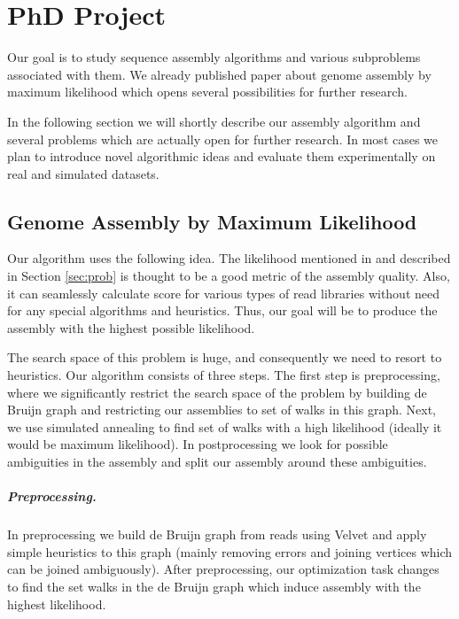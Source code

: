 \chapter{PhD Project}

Our goal is to study sequence assembly algorithms and
various subproblems associated with them.
We already published paper about genome assembly by maximum likelihood \citep{GAML}
which opens several possibilities for further research.

In the following section we will shortly describe our assembly algorithm
and several problems which are actually open for further research.
In most cases we plan to introduce novel algorithmic ideas
and evaluate them experimentally on real and simulated datasets.

\section{Genome Assembly by Maximum Likelihood}

Our algorithm uses the following idea.
The likelihood  mentioned in \cite{Ghodsi2013} and described in Section \ref{sec:prob} 
is thought to be a good metric of the assembly quality.
Also, it can seamlessly calculate score for various types of read libraries without need
for any special algorithms and heuristics. 
Thus, our goal will be to produce the assembly with the highest possible likelihood.

The search space of this problem is huge, and consequently 
we need to resort to heuristics.
Our algorithm consists of three steps.
The first step is preprocessing, where we significantly restrict the search
space of the problem
by building de Bruijn graph and restricting our assemblies to set of walks
in this graph. Next, we use simulated annealing to find set of walks
with a high likelihood (ideally it would be maximum likelihood).
In postprocessing we look for possible
ambiguities in the assembly and split our assembly around these ambiguities.

\paragraph{Preprocessing.} In preprocessing we build de Bruijn graph from reads
using Velvet \citep{Velvet} and apply simple heuristics to this graph
 (mainly removing errors and joining vertices which can be joined ambiguously).
After preprocessing, our optimization task changes to find the set walks
in the de Bruijn graph which induce assembly with the highest likelihood.

